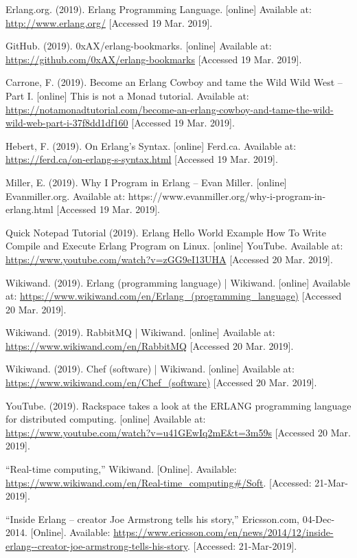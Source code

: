 \documentclass[11 pt]{IEEEtran}
\begin{document}
  
\begin{thebibliography}{99}
Erlang.org. (2019). Erlang Programming Language. [online] Available at: \url{http://www.erlang.org/} [Accessed 19 Mar. 2019].

GitHub. (2019). 0xAX/erlang-bookmarks. [online] Available at: \url{https://github.com/0xAX/erlang-bookmarks} [Accessed 19 Mar. 2019].

Carrone, F. (2019). Become an Erlang Cowboy and tame the Wild Wild West -- Part I. [online] This is not a Monad tutorial. Available at: \url{https://notamonadtutorial.com/become-an-erlang-cowboy-and-tame-the-wild-wild-web-part-i-37f8dd1df160} [Accessed 19 Mar. 2019].

Hebert, F. (2019). On Erlang's Syntax. [online] Ferd.ca. Available at: \url{https://ferd.ca/on-erlang-s-syntax.html} [Accessed 19 Mar. 2019].

Miller, E. (2019). Why I Program in Erlang – Evan Miller. [online] Evanmiller.org. Available at: https://www.evanmiller.org/why-i-program-in-erlang.html [Accessed 19 Mar. 2019].

Quick Notepad Tutorial (2019). Erlang Hello World Example How To Write Compile and Execute Erlang Program on Linux. [online] YouTube. Available at: \url{https://www.youtube.com/watch?v=zGG9eI13UHA} [Accessed 20 Mar. 2019].

Wikiwand. (2019). Erlang (programming language) | Wikiwand. [online] Available at: \url{https://www.wikiwand.com/en/Erlang_(programming_language)} [Accessed 20 Mar. 2019].

Wikiwand. (2019). RabbitMQ | Wikiwand. [online] Available at: \url{https://www.wikiwand.com/en/RabbitMQ} [Accessed 20 Mar. 2019].

Wikiwand. (2019). Chef (software) | Wikiwand. [online] Available at: \url{https://www.wikiwand.com/en/Chef_(software)} [Accessed 20 Mar. 2019].

YouTube. (2019). Rackspace takes a look at the ERLANG programming language for distributed computing. [online] Available at: \url{https://www.youtube.com/watch?v=u41GEwIq2mE&t=3m59s} [Accessed 20 Mar. 2019].

“Real-time computing,” Wikiwand. [Online]. Available: \url{https://www.wikiwand.com/en/Real-time_computing#/Soft}. [Accessed: 21-Mar-2019].

“Inside Erlang – creator Joe Armstrong tells his story,” Ericsson.com, 04-Dec-2014. [Online]. Available: \url{https://www.ericsson.com/en/news/2014/12/inside-erlang--creator-joe-armstrong-tells-his-story}. [Accessed: 21-Mar-2019].


\end{thebibliography}
\end{document}
